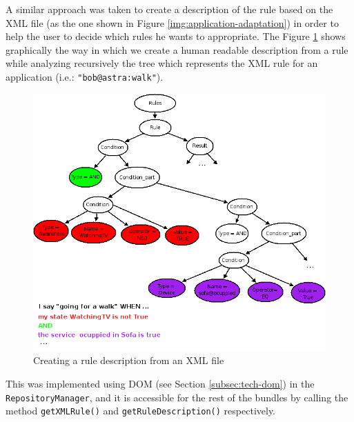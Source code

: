 A similar approach was taken to create a description  of the rule based on
the XML file (as the one shown in Figure \ref{img:application-adaptation}) in
order to help the user to decide which rules he wants to appropriate. The Figure
\ref{img:rule-tree} shows graphically the way in which we create a human
readable description from a rule while analyzing recursively the
tree which represents the XML rule for an application (i.e.:
\verb|"bob@astra:walk"|).

\begin{figure}[h!]
 \begin{center}
 \includegraphics[scale=0.5]{diagrams/rule-tree.png}
  \caption{\label{img:rule-tree} Creating a rule description from an XML
  file}
 \end{center}
\end{figure}

This was implemented using DOM (see Section \ref{subsec:tech-dom}) in the
\verb|RepositoryManager|, and it is accessible for the rest of the bundles by
calling the method \verb|getXMLRule()| and \verb|getRuleDescription()| respectively.





